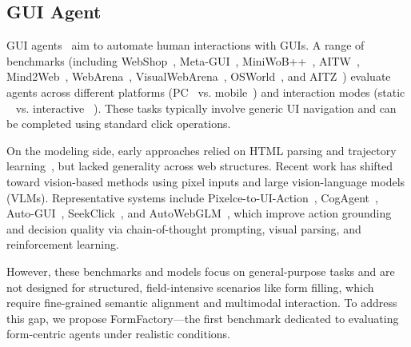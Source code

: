 \documentclass[sigconf, screen, review]{acmart}
\begin{document}
\subsection{GUI Agent}

GUI agents~\cite{czll24corr} aim to automate human interactions with GUIs.
A range of benchmarks (including WebShop~\cite{sywt22nips}, Meta-GUI~\cite{lsmg22emnlp}, MiniWoB++~\cite{tswo17icml}, AITW~\cite{craa23nips}, Mind2Web~\cite{xdmt23nips}, WebArena~\cite{szwa24iclr}, VisualWebArena~\cite{jyve24acl}, OSWorld~\cite{txob24nips}, and AITZ~\cite{jzai24emnlp}) evaluate agents across different platforms (PC~\cite{DBLP:conf/eccv/KapoorBRKKAS24, pan2024webcanvasbenchmarkingwebagents} vs. mobile~\cite{DBLP:journals/corr/abs-2412-18426, DBLP:journals/corr/abs-2501-01149, DBLP:conf/iclr/ChenYXYCWYZLWZ025}) and interaction modes (static ~\cite{DBLP:conf/iclr/ChenH0TZZHBGCLW25, chai2025amexandroidmultiannotationexpo} vs. interactive ~\cite{bonatti2024windowsagentarenaevaluating,  DBLP:conf/nips/LinLGWYYWS24}).
These tasks typically involve generic UI navigation and can be completed using standard click operations.

On the modeling side, early approaches relied on HTML parsing and trajectory learning~\cite{lzst24iclr, pcad22icml}, but lacked generality across web structures.
Recent work has shifted toward vision-based methods using pixel inputs and large vision-language models (VLMs).
Representative systems include Pixelce-to-UI-Action~\cite{psfp23nips}, CogAgent~\cite{whca24cvpr}, Auto-GUI~\cite{zzyo24acl}, SeekClick~\cite{kcsh24acl}, and AutoWebGLM~\cite{hlaa24kdd}, which improve action grounding and decision quality via chain-of-thought prompting, visual parsing, and reinforcement learning.

However, these benchmarks and models focus on general-purpose tasks and are not designed for structured, field-intensive scenarios like form filling, which require fine-grained semantic alignment and multimodal interaction.
To address this gap, we propose FormFactory—the first benchmark dedicated to evaluating form-centric agents under realistic conditions.
\end{document}
